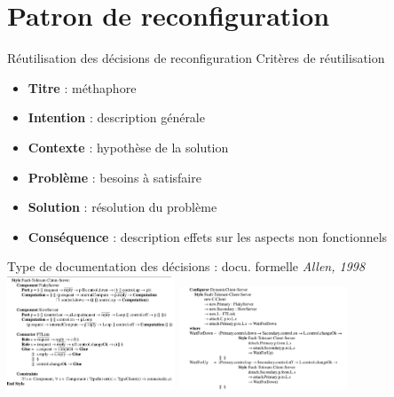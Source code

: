 \section{Patron de reconfiguration}

\begin{frame}{Réutilisation des décisions de reconfiguration}
Critères de réutilisation
\begin{itemize}
\item \textbf{Titre} : méthaphore                                                                   
\item \textbf{Intention} : description générale                                                                   
\item \textbf{Contexte} : hypothèse de la solution                                                                    
\item \textbf{Problème} : besoins à satisfaire                                                                     
\item \textbf{Solution} : résolution du problème                                                                     
\item \textbf{Conséquence} : description effets sur les aspects non
fonctionnels                                                              
\end{itemize} 
\end{frame}


\begin{frame}[fragile]{Type de documentation des décisions : docu.
formelle \emph{Allen, 1998}}
\centering
\includegraphics[width=5cm]{imgs/slide_fault-tolerance.png}
\hspace{1cm}
\includegraphics[width=5cm]{imgs/slide_reconf_specif.png}
\vspace{0.5cm}
\begin{table}[]
\end{table}
\end{frame}

